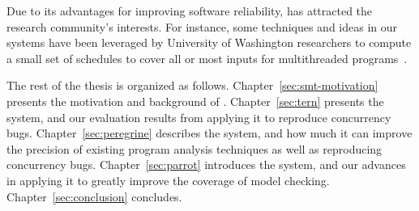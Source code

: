 Due to its advantages for improving software reliability, \smt has attracted the 
research community's interests. For instance, some techniques and ideas in our 
\smt systems have been leveraged by University of Washington researchers to 
compute a small set of schedules to cover all or most inputs for multithreaded 
programs~\cite{bergan:oopsla13}.

The rest of the thesis is organized as follows. Chapter~\ref{sec:smt-motivation}
presents the motivation and background of \smt. Chapter~\ref{sec:tern} presents
the \tern system, and our evaluation results from applying it to reproduce 
concurrency bugs. Chapter~\ref{sec:peregrine} describes the \peregrine system, 
and how much it can improve the precision of existing program analysis 
techniques as well as reproducing concurrency bugs. Chapter~\ref{sec:parrot}
introduces the \parrot system, and our advances in applying it to greatly
improve the coverage of model checking. Chapter~\ref{sec:conclusion} concludes.



